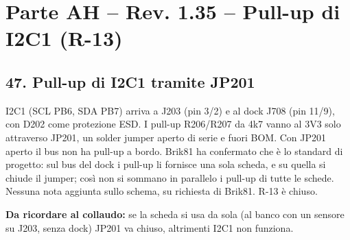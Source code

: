 \clearpage
\section[Parte AH – Rev. 1.35 – Pull-up di I2C1 (R-13)]{Parte AH – Rev. 1.35 – Pull-up di I2C1 (R-13)}

\subsection[47. Pull-up di I2C1 tramite JP201]{47. Pull-up di I2C1 tramite JP201}

I2C1 (SCL PB6, SDA PB7) arriva a J203 (pin 3/\allowbreak{}2) e al dock J708 (pin 11/\allowbreak{}9), con D202 come protezione ESD. I pull-up R206/\allowbreak{}R207 da 4k7 vanno al 3V3 solo attraverso JP201, un solder jumper aperto di serie e fuori BOM. Con JP201 aperto il bus non ha pull-up a bordo. Brik81 ha confermato che è lo standard di progetto: sul bus del dock i pull-up li fornisce una sola scheda, e su quella si chiude il jumper; così non si sommano in parallelo i pull-up di tutte le schede. Nessuna nota aggiunta sullo schema, su richiesta di Brik81. R-13 è chiuso.

\textbf{Da ricordare al collaudo:} se la scheda si usa da sola (al banco con un sensore su J203, senza dock) JP201 va chiuso, altrimenti I2C1 non funziona.
